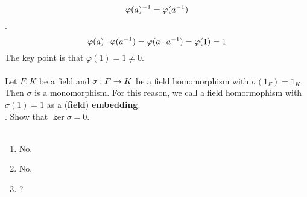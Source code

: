 $$\varphi(a)^{-1}  = \varphi(a^{-1})$$
\pf. $$\varphi(a) \cdot \varphi(a^{-1}) = \varphi(a\cdot a^{-1}) = \varphi(1) = 1$$
The key point is that $\varphi(1) = 1\neq 0$.\\
\\
 Let $F, K$ be a field and $\sigma: F\rightarrow K$ be a field homomorphism with $\sigma(1_F)=1_K$. Then $\sigma$ is a monomorphism. For this reason, we call a field homormophism with $\sigma(1) = 1$ as a (\textbf{field}) \textbf{embedding}.\\
\pf. Show that $\ker \sigma = {0}$.\\
\\
\begin{enumerate}
	\item No.
	\item No.
	\item ?
\end{enumerate}
\pagebreak